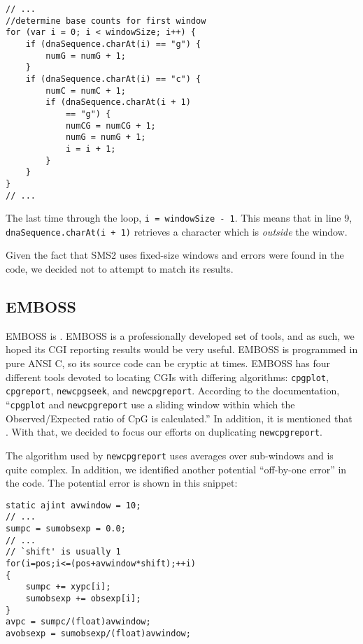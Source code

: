 \documentclass{bioinfo}
\begin{document}
\begin{verbatim}
// ...
//determine base counts for first window
for (var i = 0; i < windowSize; i++) {
    if (dnaSequence.charAt(i) == "g") {
        numG = numG + 1;
    }
    if (dnaSequence.charAt(i) == "c") {
        numC = numC + 1;
        if (dnaSequence.charAt(i + 1)
            == "g") {
            numCG = numCG + 1;
            numG = numG + 1;
            i = i + 1;
        }
    }
}
// ...
\end{verbatim}

The last time through the loop, \verb|i = windowSize - 1|.  This means
that in line 9, \verb|dnaSequence.charAt(i + 1)| retrieves a character
which is \emph{outside} the window.

Given the fact that SMS2 uses fixed-size windows and errors were found
in the code, we decided not to attempt to match its results.

\subsection{EMBOSS}

EMBOSS is . EMBOSS is a professionally developed set of
tools, and as such, we hoped its CGI reporting results would be very
useful. EMBOSS is programmed in pure ANSI C, so its source code can be
cryptic at times. EMBOSS has four different tools devoted to locating
CGIs with differing algorithms: \texttt{cpgplot}, \texttt{cpgreport},
\texttt{newcpgseek}, and \texttt{newcpgreport}. According to the
documentation, ``\texttt{cpgplot} and \texttt{newcpgreport} use a
sliding window within which the Observed/Expected ratio of CpG is
calculated.'' In addition, it is mentioned that
. With
that, we decided to focus our efforts on duplicating
\texttt{newcpgreport}.

The algorithm used by \texttt{newcpgreport} uses averages over
sub-windows and is quite complex. In addition, we identified another
potential ``off-by-one error'' in the code. The potential error is
shown in this snippet:

\begin{verbatim}
static ajint avwindow = 10;
// ...
sumpc = sumobsexp = 0.0;
// ...
// `shift' is usually 1
for(i=pos;i<=(pos+avwindow*shift);++i)
{
    sumpc += xypc[i];
    sumobsexp += obsexp[i];
}
avpc = sumpc/(float)avwindow;
avobsexp = sumobsexp/(float)avwindow;
\end{verbatim}
\end{document}
